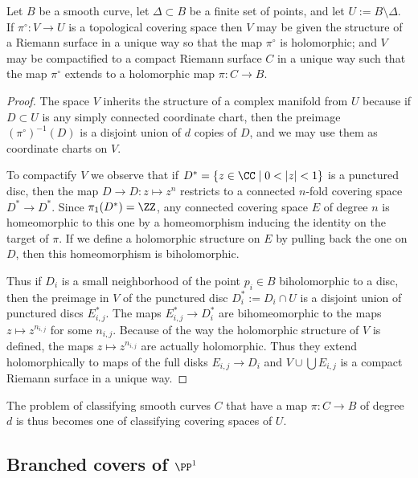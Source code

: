 \begin{theorem}
 Let $B$ be a smooth curve, let $\Delta\subset B$ be a finite set of points, and let $U := B\setminus \Delta$.
If $\pi^\circ : V \to U$ is a topological covering space then $V$ may be given the structure of a Riemann surface in a unique way so that the map $\pi^\circ$ is holomorphic; and $V$ may be compactified to a compact Riemann surface $C$ in a unique way such that the map $\pi^\circ$ extends to a holomorphic map $\pi : C \to B$.
\end{theorem} 

\begin{proof}
The space $V$ inherits the structure of a complex manifold from $U$ because if $D \subset U$ is any simply connected coordinate chart, then the preimage $({\pi^\circ})^{-1}(D)$ is a disjoint union of $d$ copies of $D$, and we may use them as coordinate charts on $V$. 
   
To compactify $V$ we observe that if $D^* = \{ z \in \CC \mid 0 < |z| < 1 \}$ is a punctured disc, then
the map $D\to D: z \mapsto z^n$ restricts to a connected $n$-fold covering space $D^*\to D^*$. 
Since $\pi_1(D^*) = \ZZ$, any connected covering space $E$ of degree $n$ is homeomorphic to this one
by a homeomorphism inducing the identity on the target of $\pi$.
If we  define a holomorphic structure on $E$ by pulling back the one on $D$, then
this homeomorphism is biholomorphic.

Thus if $D_i$ is a small neighborhood of the point $p_i \in B$ biholomorphic to a disc, then the preimage  in $V$ of the punctured disc $D_i^* := D_i \cap U$ is a disjoint union of punctured discs $E_{i,j}^{*}$. The maps $E^{*}_{i,j} \to D_{i}^{*}$
are bihomeomorphic to the maps $z\mapsto z^{n_{i,j}}$ for some $n_{i,j}$. Because of the way the holomorphic structure
of $V$ is defined, the maps $z\mapsto z^{n_{i,j}}$ are actually holomorphic. Thus they extend holomorphically
to maps of the full disks $E_{i,j}\to D_{i}$ and $V\cup \bigcup E_{i,j}$ is a compact Riemann surface in a unique way. \end{proof}
   
 The problem of classifying smooth curves $C$ that have a map $\pi : C \to B$ of degree $d$ is thus becomes one of classifying covering spaces of $U$. 
    
 \subsection{Branched covers of $\PP^1$} 


